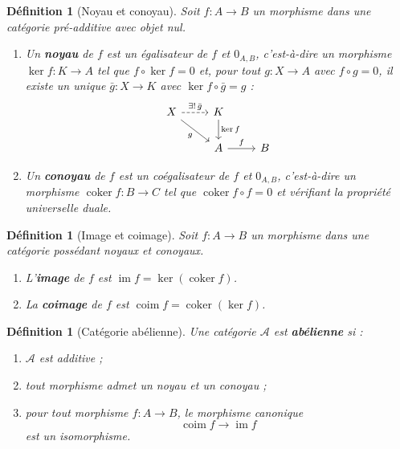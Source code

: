 \documentclass[a4paper,12pt]{book}
\DeclareMathOperator{\im}{im}
\DeclareMathOperator{\coker}{coker}
\newtheorem{definition}[theoreme]{Définition}
\begin{document}
\begin{definition}[Noyau et conoyau]\label{def:kernel-cokernel}
Soit $f \colon A \to B$ un morphisme dans une catégorie pré-additive
avec objet nul.
\begin{enumerate}[label=(\roman*)]
\item Un \textbf{noyau} de $f$ est un
  égalisateur de $f$ et $0_{A,B}$, c'est-à-dire un
  morphisme $\ker f \colon K \to A$ tel que $f \circ \ker f = 0$ et,
  pour tout $g \colon X \to A$ avec $f \circ g = 0$, il existe un unique
  $\bar{g} \colon X \to K$ avec $\ker f \circ \bar{g} = g$ :
\[
\begin{tikzcd}
X \arrow[dr, "g"'] \arrow[r, dashed, "\exists!\,\bar{g}"]
& K \arrow[d, "\ker f"] \\
& A \arrow[r, "f"] & B
\end{tikzcd}
\]

\item Un \textbf{conoyau} de $f$ est un
  coégalisateur de $f$ et $0_{A,B}$, c'est-à-dire un
  morphisme $\coker f \colon B \to C$ tel que $\coker f \circ f = 0$ et
  vérifiant la propriété universelle duale.
\end{enumerate}
\end{definition}

\begin{definition}[Image et coimage]\label{def:image-coimage}
Soit $f \colon A \to B$ un morphisme dans une catégorie possédant
noyaux et conoyaux.
\begin{enumerate}[label=(\roman*)]
\item L'\textbf{image} de $f$ est $\im f = \ker(\coker f)$.
\item La \textbf{coimage} de $f$ est $\operatorname{coim} f = \coker(\ker f)$.
\end{enumerate}
\end{definition}

\begin{definition}[Catégorie abélienne]\label{def:abelian-cat}
Une catégorie $\mathcal{A}$ est \textbf{abélienne} si :
\begin{enumerate}[label=(AB\arabic*)]
\item\label{AB0} $\mathcal{A}$ est additive ;
\item\label{AB1} tout morphisme admet un noyau et un conoyau ;
\item\label{AB2} pour tout morphisme $f \colon A \to B$, le morphisme
  canonique
  \[
    \operatorname{coim} f \longrightarrow \im f
  \]
  est un isomorphisme.
\end{enumerate}
\end{definition}
\end{document}
